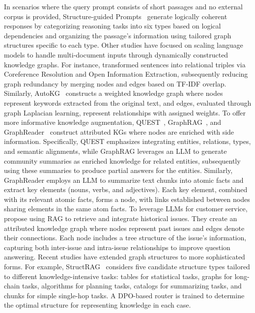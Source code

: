 \documentclass[lettersize,journal]{IEEEtran}
\begin{document}
In scenarios where the query prompt consists of short passages and no external corpus is provided, Structure-guided Prompts~\cite{cheng2024structure} generate logically coherent responses by categorizing reasoning tasks into six types based on logical dependencies and organizing the passage's information using tailored graph structures specific to each type.
Other studies have focused on scaling language models to handle multi-document inputs through dynamically constructed knowledge graphs.
For instance, \cite{fan2019using} transformed sentences into relational triples via Coreference Resolution and Open Information Extraction, subsequently reducing graph redundancy by merging nodes and edges based on TF-IDF overlap.
Similarly, AutoKG~\cite{chen2023autokg} constructs a weighted knowledge graph where nodes represent keywords extracted from the original text, and edges, evaluated through graph Laplacian learning, represent relationships with assigned weights.
To offer more informative knowledge augmentation, QUEST~\cite{quest-quasi}, GraphRAG~\cite{edge2024local}, and GraphReader~\cite{li2024graphreader} construct attributed KGs where nodes are enriched with side information. Specifically, QUEST emphasizes integrating entities, relations, types, and semantic alignments, while GraphRAG leverages an LLM to generate community summaries as enriched knowledge for related entities, subsequently using these summaries to produce partial answers for the entities.
Similarly, GraphReader employs an LLM to summarize text chunks into atomic facts and extract key elements (nouns, verbs, and adjectives). Each key element, combined with its relevant atomic facts, forms a node, with links established between nodes sharing elements in the same atom facts. To leverage LLMs for customer service, \cite{xu2024retrieval} propose using RAG to retrieve and integrate historical issues. They create an attributed knowledge graph where nodes represent past issues and edges denote their connections. Each node includes a tree structure of the issue's information, capturing both inter-issue and intra-issue relationships to improve question answering. Recent studies have extended graph structures to more sophisticated forms. For example, StructRAG~\cite{li2024structrag} considers five candidate structure types tailored to different knowledge-intensive tasks: tables for statistical tasks, graphs for long-chain tasks, algorithms for planning tasks, catalogs for summarizing tasks, and chunks for simple single-hop tasks. A DPO-based router is trained to determine the optimal structure for representing knowledge in each case.
\end{document}
